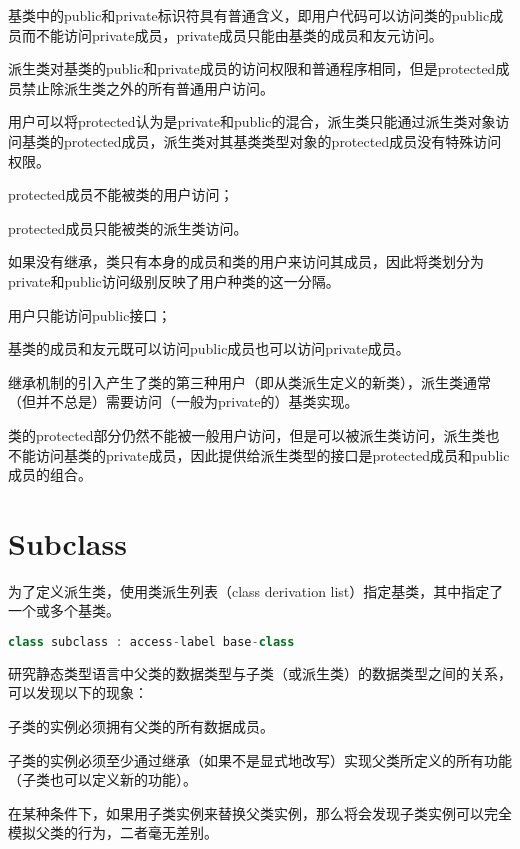 基类中的public和private标识符具有普通含义，即用户代码可以访问类的public成员而不能访问private成员，private成员只能由基类的成员和友元访问。

派生类对基类的public和private成员的访问权限和普通程序相同，但是protected成员禁止除派生类之外的所有普通用户访问。

用户可以将protected认为是private和public的混合，派生类只能通过派生类对象访问基类的protected成员，派生类对其基类类型对象的protected成员没有特殊访问权限。

\begin{compactitem}
\item protected成员不能被类的用户访问；
\item protected成员只能被类的派生类访问。
\end{compactitem}

如果没有继承，类只有本身的成员和类的用户来访问其成员，因此将类划分为private和public访问级别反映了用户种类的这一分隔。

\begin{compactitem}
\item 用户只能访问public接口；
\item 基类的成员和友元既可以访问public成员也可以访问private成员。
\end{compactitem}

继承机制的引入产生了类的第三种用户（即从类派生定义的新类），派生类通常（但并不总是）需要访问（一般为private的）基类实现。

类的protected部分仍然不能被一般用户访问，但是可以被派生类访问，派生类也不能访问基类的private成员，因此提供给派生类型的接口是protected成员和public成员的组合。



\chapter{Subclass}

为了定义派生类，使用类派生列表（class derivation list）指定基类，其中指定了一个或多个基类。



\begin{lstlisting}[language=C++]
class subclass : access-label base-class
\end{lstlisting}

研究静态类型语言中父类的数据类型与子类（或派生类）的数据类型之间的关系，可以发现以下的现象：

\begin{compactitem}
\item 子类的实例必须拥有父类的所有数据成员。
\item 子类的实例必须至少通过继承（如果不是显式地改写）实现父类所定义的所有功能（子类也可以定义新的功能）。
\item 在某种条件下，如果用子类实例来替换父类实例，那么将会发现子类实例可以完全模拟父类的行为，二者毫无差别。
\end{compactitem}

